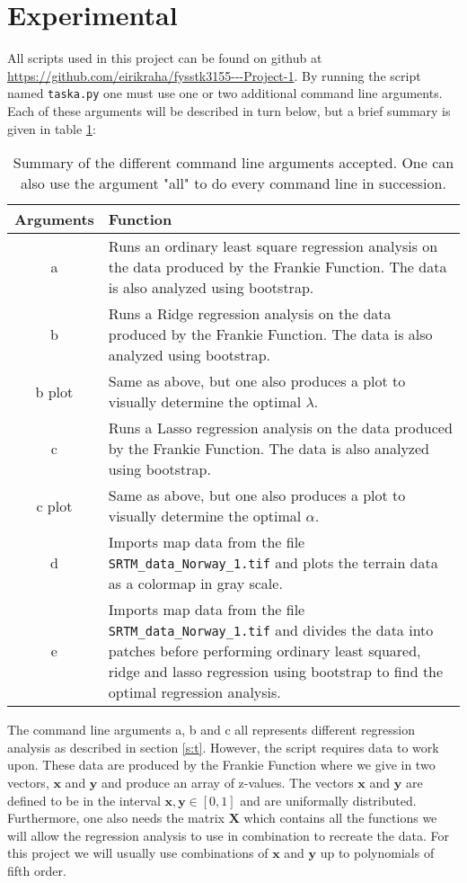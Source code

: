 \documentclass[12pt]{article}
\begin{document}
\section{Experimental}   \label{s:e}
All scripts used in this project can be found on github at \url{https://github.com/eirikraha/fysstk3155---Project-1}. By running the script named \texttt{taska.py} one must use one or two additional command line arguments. Each of these arguments will be described in turn below, but a brief summary is given in table \ref{tabE:sum}:
\begin{table}[H]
\centering
\begin{tabular}{c|p{12cm}}
\textbf{Arguments} & \textbf{Function} \\ \hline
a & Runs an ordinary least square regression analysis on the data produced by the Frankie Function. The data is also analyzed using bootstrap. \\ \hline
b & Runs a Ridge regression analysis on the data produced by the Frankie Function. The data is also analyzed using bootstrap. \\ \hline
b plot & Same as above, but one also produces a plot to visually determine the optimal $\lambda$. \\ \hline
c & Runs a Lasso regression analysis on the data produced by the Frankie Function. The data is also analyzed using bootstrap. \\ \hline
c plot & Same as above, but one also produces a plot to visually determine the optimal $\alpha$. \\ \hline
d & Imports map data from the file \texttt{SRTM\_data\_Norway\_1.tif} and plots the terrain data as a colormap in gray scale. \\ \hline
e & Imports map data from the file \texttt{SRTM\_data\_Norway\_1.tif} and divides the data into patches before performing ordinary least squared, ridge and lasso regression using bootstrap to find the optimal regression analysis.
\end{tabular}
\caption{Summary of the different command line arguments accepted. One can also use the argument "all" to do every command line in succession.}
\label{tabE:sum}
\end{table}
The command line arguments a, b and c all represents different regression analysis as described in section \ref{s:t}. However, the script requires data to work upon. These data are produced by the Frankie Function where we give in two vectors, $\bm{x}$ and $\bm{y}$ and produce an array of z-values. The vectors  $\bm{x}$ and $\bm{y}$ are defined to be in the interval $\bm{x}, \bm{y} \in [0,1]$ and are uniformally distributed. Furthermore, one also needs the matrix $\bm{X}$ which contains all the functions we will allow the regression analysis to use in combination to recreate the data. For this project we will usually use combinations of $\bm{x}$ and $\bm{y}$ up to polynomials of fifth order.
\end{document}
